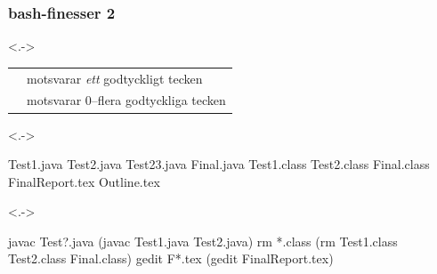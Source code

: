 \begin{frame}[fragile,t]
    \frametitle{bash-finesser 2}

    \blankline
    \begin{onlyenv}<.->
        \begin{tabular}{ll}
            \code{?} & motsvarar \emph{ett} godtyckligt tecken \\
            \code{*} & motsvarar 0--flera godtyckliga tecken   \\
        \end{tabular}
    \end{onlyenv}

    \blankline
    \begin{onlyenv}<.->
        \begin{GobbleCode}{8}
            Test1.java  Test2.java  Test23.java  Final.java
            Test1.class Test2.class Final.class  FinalReport.tex
            Outline.tex
        \end{GobbleCode}
    \end{onlyenv}
    
    \begin{onlyenv}<.->
        \begin{GobbleCode}{8}
            javac Test?.java (javac Test1.java Test2.java)
            rm *.class       (rm Test1.class Test2.class Final.class)
            gedit F*.tex     (gedit FinalReport.tex)
        \end{GobbleCode}
    \end{onlyenv}

\end{frame}




